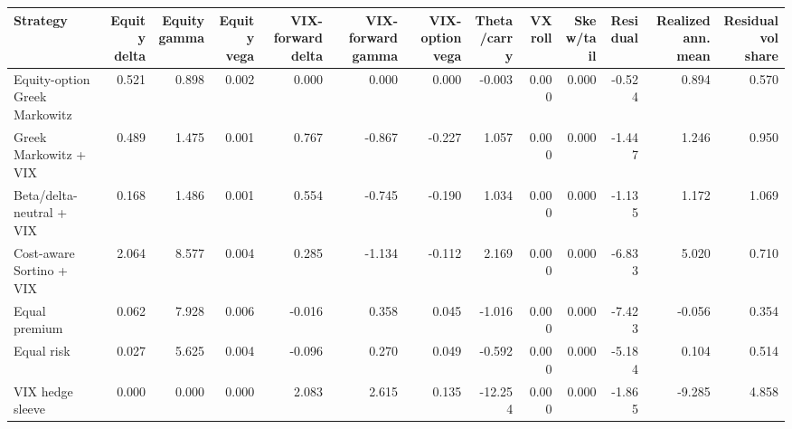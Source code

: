 \begin{tabular}{lrrrrrrrrrrrr}
\toprule
Strategy & Equity delta & Equity gamma & Equity vega & VIX-forward delta & VIX-forward gamma & VIX-option vega & Theta/carry & VX roll & Skew/tail & Residual & Realized ann. mean & Residual vol share \\
\midrule
Equity-option Greek Markowitz & 0.521 & 0.898 & 0.002 & 0.000 & 0.000 & 0.000 & -0.003 & 0.000 & 0.000 & -0.524 & 0.894 & 0.570 \\
Greek Markowitz + VIX & 0.489 & 1.475 & 0.001 & 0.767 & -0.867 & -0.227 & 1.057 & 0.000 & 0.000 & -1.447 & 1.246 & 0.950 \\
Beta/delta-neutral + VIX & 0.168 & 1.486 & 0.001 & 0.554 & -0.745 & -0.190 & 1.034 & 0.000 & 0.000 & -1.135 & 1.172 & 1.069 \\
Cost-aware Sortino + VIX & 2.064 & 8.577 & 0.004 & 0.285 & -1.134 & -0.112 & 2.169 & 0.000 & 0.000 & -6.833 & 5.020 & 0.710 \\
Equal premium & 0.062 & 7.928 & 0.006 & -0.016 & 0.358 & 0.045 & -1.016 & 0.000 & 0.000 & -7.423 & -0.056 & 0.354 \\
Equal risk & 0.027 & 5.625 & 0.004 & -0.096 & 0.270 & 0.049 & -0.592 & 0.000 & 0.000 & -5.184 & 0.104 & 0.514 \\
VIX hedge sleeve & 0.000 & 0.000 & 0.000 & 2.083 & 2.615 & 0.135 & -12.254 & 0.000 & 0.000 & -1.865 & -9.285 & 4.858 \\
\bottomrule
\end{tabular}
